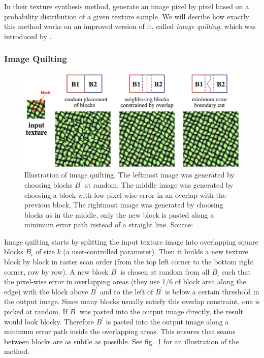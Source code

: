 In their texture synthesis method, \citet{Efros1999} generate an image pixel by pixel based on a probability distribution of a given texture sample. We will desribe how exactly this method works on an improved version of it, called \textit{image quilting}, which was introduced by \citet{Efros2001}.

\subsubsection{Image Quilting}
\label{section:background-texture_synthesis-patch_based-quilting}

\begin{figure}
    \centering
    \includegraphics[width=\textwidth]{images/02-quilting_method.jpg}
    \caption{Illustration of image quilting. The leftmost image was generated by choosing blocks \(B^{\prime}\) at random. The middle image was generated by choosing a block with low pixel-wise error in an overlap with the previous block. The rightmost image was generated by choosing blocks as in the middle, only the new block is pasted along a minimum error path instead of a straight line.  Source: \citet{Efros2001}}
    \label{fig:background_quilting_method}
\end{figure}

Image quilting starts by splitting the input texture image into overlapping square blocks \(B_i\) of size \(k\) (a user-controlled parameter). Then it builds a new texture block by block in raster scan order (from the top left corner to the bottom right corner, row by row). A new block \(B^{\prime}\) is chosen at random from all \(B_i\) such that the pixel-wise error in overlapping areas (they use 1/6 of block area along the edge) with the block above \(B^{\prime}\) and to the left of \(B^{\prime}\) is below a certain threshold in the output image. Since many blocks usually satisfy this overlap constraint, one is picked at random. If \(B^{\prime}\) was pasted into the output image directly, the result would look blocky. Therefore \(B^{\prime}\) is pasted into the output image along a minimum error path inside the overlapping areas. This ensures that seams between blocks are as subtle as possible. See fig.~\ref{fig:background_quilting_method} for an illustration of the method.

